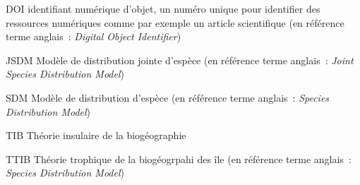 \listedesfigures


\listeabrev
\begin{liste}

\item[DOI] identifiant numérique d'objet, un numéro unique pour identifier des ressources numériques comme par exemple un article scientifique (en référence terme anglais~: \textit{Digital Object Identifier})

\item[JSDM] Modèle de distribution jointe d'espèce (en référence terme anglais~: \textit{Joint Species Distribution Model})

\item[SDM] Modèle de distribution d'espèce (en référence terme anglais~: \textit{Species Distribution Model})

\item[TIB] Théorie insulaire de la biogéographie

\item[TTIB] Théorie trophique de la biogéogrpahi des île (en référence terme anglais~: \textit{Species Distribution Model})

\end{liste}




%
%


\cleardoublepage

